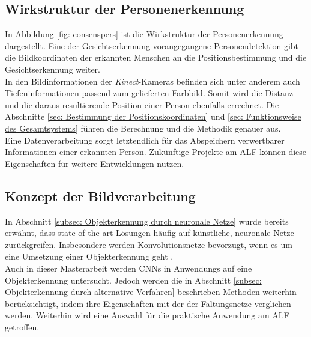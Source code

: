 	\subsection{Wirkstruktur der Personenerkennung}
	\label{subsec: Wirkstrukur Personenerkennung}
	In Abbildung \ref{fig: consenspers} ist die Wirkstruktur der Personenerkennung dargestellt. Eine der Gesichtserkennung vorangegangene Personendetektion gibt die Bildkoordinaten der erkannten Menschen an die Positionsbestimmung und die Gesichtserkennung weiter.\\
	
	In den Bildinformationen der \textit{Kinect}-Kameras befinden sich unter anderem auch Tiefeninformationen passend zum gelieferten Farbbild. Somit wird die Distanz und die daraus resultierende Position einer Person ebenfalls errechnet. Die Abschnitte \ref{sec: Bestimmung der Positionskoordinaten} und \ref{sec: Funktionsweise des Gesamtsystems} führen die Berechnung und die Methodik genauer aus.\\
		
	
	

		
	Eine Datenverarbeitung sorgt letztendlich für das Abspeichern verwertbarer Informationen einer erkannten Person. Zukünftige Projekte am ALF können diese Eigenschaften für weitere Entwicklungen nutzen.\\   
		
	\subsection{Konzept der Bildverarbeitung}
	\label{subsec: Auswahl und Training der verwendeten neuronalen Netze}
		
	In Abschnitt \ref{subsec: Objekterkennung durch neuronale Netze} wurde bereits erwähnt, dass state-of-the-art Lösungen häufig auf künstliche, neuronale Netze zurückgreifen. Insbesondere werden Konvolutionsnetze bevorzugt, wenn es um eine Umsetzung einer Objekterkennung geht \cite{bildundobjekt}.\\
	
	Auch in dieser Masterarbeit werden CNNs in Anwendungs auf eine Objekterkennung untersucht. Jedoch werden die in Abschnitt \ref{subsec: Objekterkennung durch alternative Verfahren} beschrieben Methoden weiterhin berücksichtigt, indem ihre Eigenschaften mit der der Faltungsnetze verglichen werden. Weiterhin wird eine Auswahl für die praktische Anwendung am ALF getroffen. \\
		
